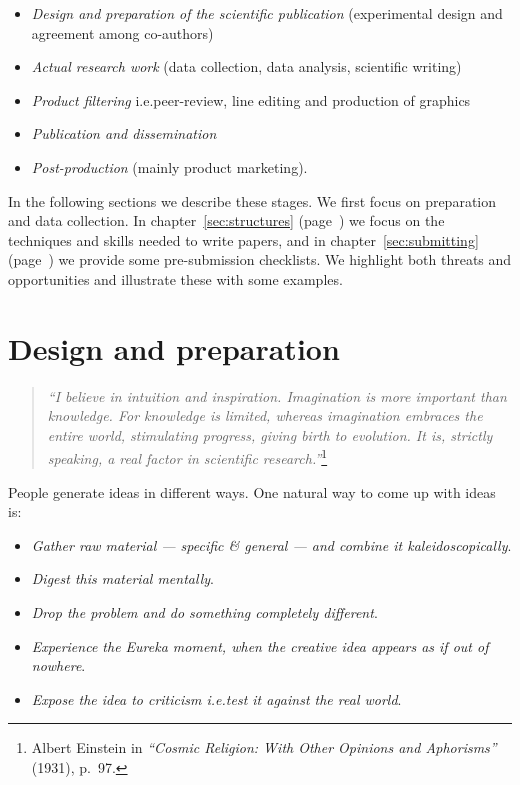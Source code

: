 \documentclass[graybox,envcountchap,sectrefs,UStrade]{svmono}
\begin{document}
\begin{itemize}
  \item \emph{Design and preparation of the scientific publication} (experimental design and agreement among co-authors)
  \item \emph{Actual research work} (data collection, data analysis, scientific writing)
  \item \emph{Product filtering} i.e.\@ peer-review, line editing and production of graphics
  \item \emph{Publication and dissemination}
  \item \emph{Post-production} (mainly product marketing).
\end{itemize}

In the following sections we describe these stages. We first focus on preparation and data collection. In chapter~\ref{sec:structures} (page~\pageref{sec:structures}) we focus on the techniques and skills needed to write papers, and in chapter~\ref{sec:submitting} (page~\pageref{sec:submitting}) we provide some pre-submission checklists. We highlight both threats and opportunities and illustrate these with some examples. \par


\section{Design and preparation}\label{sec:preparation}

\begin{quote}
    \emph{``I believe in intuition and inspiration. Imagination is more important than knowledge. For knowledge is limited, whereas imagination embraces the entire world, stimulating progress, giving birth to evolution. It is, strictly speaking, a real factor in scientific research.''}\footnote{Albert Einstein in \emph{``Cosmic Religion: With Other Opinions and Aphorisms''} (1931), p.~97.}
\end{quote}

People generate ideas in different ways. One natural way to come up with ideas is:

\begin{itemize}
  \item \emph{Gather raw material --- specific \& general --- and combine it kaleidoscopically}.
  \item \emph{Digest this material mentally}.
  \item \emph{Drop the problem and do something completely different}.
  \item \emph{Experience the Eureka moment, when the creative idea appears as if out of nowhere}.
  \item \emph{Expose the idea to criticism i.e.\@ test it against the real world}.
\end{itemize}
\end{document}
